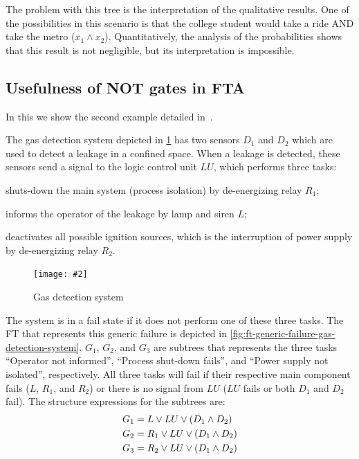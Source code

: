\documentclass[12pt,openright,twoside,a4paper,oldfontcommands,english,brazil,final]{abntex2}
\theoremstyle{theo}
\newcommand{\includegraphicsaspectratio}[2][1]{%
  \texttt{[image: \#2]}%
}
\newcommand{\parsin}[1]{\ensuremath\left( #1 \right)}
\begin{document}
The problem with this tree is the interpretation of the qualitative results.
One of the possibilities in this scenario is that the college student would take a ride \ac{AND} take the metro ($x_1 \land x_2$).
Quantitatively, the analysis of the probabilities shows that this result is not negligible, but its interpretation is impossible.

\subsection[Usefulness of NOT gates in FTA]{Usefulness of \ac{NOT} gates in \ac{FTA}}
\label{sec:non-coherent-usefulness}

In this  we show the second example detailed in~\cite{Andrews2001}.

The gas detection system depicted in \cref{fig:gas-detection-system} has two sensors $D_1$ and $D_2$ which are used to detect a leakage in a confined space.
When a leakage is detected, these sensors send a signal to the logic control unit $LU$, which performs three tasks:
%
\begin{alineas}
  \item shuts-down the main system (process isolation) by de-energizing relay $R_1$;
  \item informs the operator of the leakage by lamp and siren $L$;
  \item deactivates all possible ignition sources, which is the interruption of power supply by de-energizing relay $R_2$.
\end{alineas}

\begin{figure}[htb]
  \centering
  \includegraphicsaspectratio[0.45]{gas-detection-system}
  \caption{Gas detection system}
  \label{fig:gas-detection-system}
\end{figure}

The system is in a fail state if it does not perform one of these three tasks.
The \acl{FT} that represents this generic failure is depicted in \cref{fig:ft-generic-failure-gas-detection-system}.
$G_1$, $G_2$, and $G_3$ are subtrees that represents the three tasks ``Operator not informed'', ``Process shut-down fails'', and ``Power supply not isolated'', respectively.
All three tasks will fail if their respective main component fails ($L$, $R_1$, and $R_2$) or there is no signal from $LU$ ($LU$ fails or both $D_1$ and $D_2$ fail).
The structure expressions for the subtrees are:
%
\begin{align*}
  G_1 & = L \lor LU \lor \parsin{D_1 \land D_2}\\
  G_2 & = R_1 \lor LU \lor \parsin{D_1 \land D_2}\\
  G_3 & = R_2 \lor LU \lor \parsin{D_1 \land D_2}
\end{align*}
\end{document}
